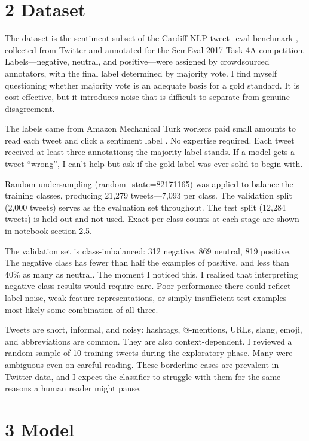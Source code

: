 \documentclass[12pt]{article}
\begin{document}
\section*{2 Dataset}



The dataset is the sentiment subset of the Cardiff NLP tweet\_eval benchmark \citep{barbieri2020tweeteval}, collected from Twitter and annotated for the SemEval 2017 Task 4A competition.
Labels---negative, neutral, and positive---were assigned by crowdsourced annotators, with the final label determined by majority vote.
I find myself questioning whether majority vote is an adequate basis for a gold standard.
It is cost-effective, but it introduces noise that is difficult to separate from genuine disagreement.

The labels came from Amazon Mechanical Turk workers paid small amounts to read each tweet and click a sentiment label \citep{rosenthal2017semeval}.
No expertise required.
Each tweet received at least three annotations; the majority label stands.
If a model gets a tweet ``wrong'', I can't help but ask if the gold label was ever solid to begin with.

Random undersampling (random\_state=82171165) was applied to balance the training classes, producing 21,279 tweets---7,093 per class.
The validation split (2,000 tweets) serves as the evaluation set throughout.
The test split (12,284 tweets) is held out and not used.
Exact per-class counts at each stage are shown in notebook section 2.5.

The validation set is class-imbalanced: 312 negative, 869 neutral, 819 positive.
The negative class has fewer than half the examples of positive, and less than 40\% as many as neutral.
The moment I noticed this, I realised that interpreting negative-class results would require care.
Poor performance there could reflect label noise, weak feature representations, or simply insufficient test examples---most likely some combination of all three.

Tweets are short, informal, and noisy: hashtags, @-mentions, URLs, slang, emoji, and abbreviations are common.
They are also context-dependent.
I reviewed a random sample of 10 training tweets during the exploratory phase.
Many were ambiguous even on careful reading.
These borderline cases are prevalent in Twitter data, and I expect the classifier to struggle with them for the same reasons a human reader might pause.



\section*{3 Model}
\end{document}
